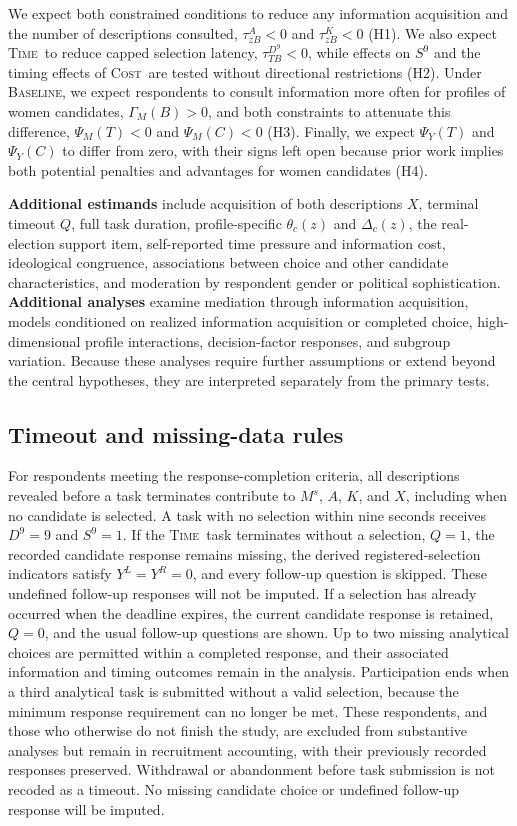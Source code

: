 \documentclass[11pt]{article}\usepackage[]{graphicx}\usepackage[]{xcolor}
\newcommand{\armT}{\textsc{Time}}
\newcommand{\armC}{\textsc{Cost}}
\newcommand{\armB}{\textsc{Baseline}}
\begin{document}
We expect both constrained conditions to reduce any information acquisition and the number of descriptions consulted, $\tau^A_{zB}<0$ and $\tau^K_{zB}<0$ (H1). We also expect \armT\ to reduce capped selection latency, $\tau^{D^{9}}_{TB}<0$, while effects on $S^{9}$ and the timing effects of \armC\ are tested without directional restrictions (H2). Under \armB, we expect respondents to consult information more often for profiles of women candidates, $\Gamma_M(B)>0$, and both constraints to attenuate this difference, $\Psi_M(T)<0$ and $\Psi_M(C)<0$ (H3). Finally, we expect $\Psi_Y(T)$ and $\Psi_Y(C)$ to differ from zero, with their signs left open because prior work implies both potential penalties and advantages for women candidates (H4).

\textbf{Additional estimands} include acquisition of both descriptions $X$, terminal timeout $Q$, full task duration, profile-specific $\theta_c(z)$ and $\Delta_c(z)$, the real-election support item, self-reported time pressure and information cost, ideological congruence, associations between choice and other candidate characteristics, and moderation by respondent gender or political sophistication. \textbf{Additional analyses} examine mediation through information acquisition, models conditioned on realized information acquisition or completed choice, high-dimensional profile interactions, decision-factor responses, and subgroup variation. Because these analyses require further assumptions or extend beyond the central hypotheses, they are interpreted separately from the primary tests.

\subsection{Timeout and missing-data rules}

For respondents meeting the response-completion criteria, all descriptions revealed before a task terminates contribute to $M^s$, $A$, $K$, and $X$, including when no candidate is selected. A task with no selection within nine seconds receives $D^{9}=9$ and $S^{9}=1$. If the \armT\ task terminates without a selection, $Q=1$, the recorded candidate response remains missing, the derived registered-selection indicators satisfy $Y^L=Y^R=0$, and every follow-up question is skipped. These undefined follow-up responses will not be imputed. If a selection has already occurred when the deadline expires, the current candidate response is retained, $Q=0$, and the usual follow-up questions are shown. Up to two missing analytical choices are permitted within a completed response, and their associated information and timing outcomes remain in the analysis. Participation ends when a third analytical task is submitted without a valid selection, because the minimum response requirement can no longer be met. These respondents, and those who otherwise do not finish the study, are excluded from substantive analyses but remain in recruitment accounting, with their previously recorded responses preserved. Withdrawal or abandonment before task submission is not recoded as a timeout. No missing candidate choice or undefined follow-up response will be imputed.
\end{document}

